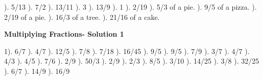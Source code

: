 \documentclass{article}%
\begin{document}
). 5/13%
). 7/2%
). 13/11%
). 3%
). 13/9%
). 1%
). 2/19%
). 5/3 of a pie.%
). 9/5 of a pizza.%
). 2/19 of a pie.%
). 16/3 of a tree.%
). 21/16 of a cake.%
\newline%
\newpage%
\large%
\begin{center}%
\textbf{Multiplying Fractions- Solution 1}%
\newline%
\end{center} \normalsize%
1). 6/7%
). 4/7%
). 12/5%
). 7/8%
). 7/18%
). 16/45%
). 9/5%
). 9/5%
). 7/9%
). 3/7%
). 4/7%
). 4/3%
). 4/5%
). 7/6%
). 2/9%
). 50/3%
). 2/9%
). 2/3%
). 8/5%
). 3/10%
). 14/25%
). 3/8%
). 32/25%
). 6/7%
). 14/9%
). 16/9%
\newline%
\end{document}
